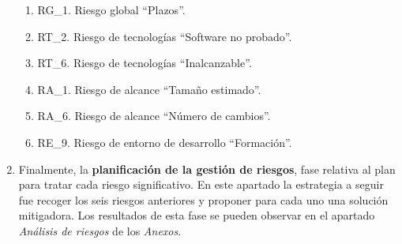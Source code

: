 \begin{enumerate}
\begin{enumerate}
\item RG\_1. Riesgo global “Plazos”. 
\item RT\_2. Riesgo de tecnologías “Software no probado”.  
\item RT\_6. Riesgo de tecnologías “Inalcanzable”. 
\item RA\_1. Riesgo de alcance “Tamaño estimado”. 
\item RA\_6. Riesgo de alcance “Número de cambios”.  
\item RE\_9. Riesgo de entorno de desarrollo “Formación”. 
\end{enumerate}
\item Finalmente, la \textbf{planificación de la gestión de riesgos}, fase relativa al plan para tratar cada riesgo significativo. En este apartado la estrategia a seguir fue recoger los seis riesgos anteriores y proponer para cada uno una solución mitigadora. Los resultados de esta fase se pueden observar en el apartado \textit{Análisis de riesgos} de los \textit{Anexos}.
\end{enumerate}

